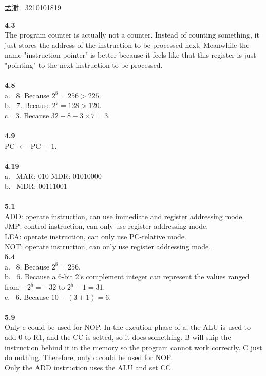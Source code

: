 \documentclass[a4paper,12pt]{article}     %
\begin{document}
\begin{center}   %
孟澍 \ 3210101819
\end{center}

\noindent %
\textbf{4.3}\\
The program counter is actually not a counter. Instead of counting something, it just stores the address of the instruction to be processed next. Meanwhile the name "instruction pointer" is better because it feels like that this register is just "pointing" to the next instruction to be processed.\\

~\\
\textbf{4.8}\\
a. \ 8. Because $2^8 = 256 > 225.$\\
b. \ 7. Because $2^7 = 128 > 120.$\\
c. \ 3. Because $32 - 8 - 3 \times 7 = 3.$\\

~\\
\textbf{4.9}\\
PC $\leftarrow$ PC + 1.\\

~\\
\textbf{4.19}\\
a. \ MAR: 010 \quad MDR: 01010000\\
b. \ MDR: 00111001 \\

~\\
\textbf{5.1}\\
ADD: operate instruction, can use immediate and register addressing mode.\\
JMP: control instruction, can only use register addressing mode.\\
LEA: operate instruction, can only use PC-relative mode.\\
NOT: operate instruction, can only use register addressing mode.\\

\newpage
\noindent
\textbf{5.4}\\
a. \ 8. Because $2^8 = 256.$\\
b. \ 6. Because a 6-bit 2's complement integer can represent the values ranged from $-2^{5} = -32$ to $2^{5}-1 = 31.$\\
c. \ 6. Because $10 - (3+1) = 6.$\\

~\\
\textbf{5.9}\\
Only c could be used for NOP. In the excution phase of a, the ALU is used to add 0 to R1, and the CC is setted, so it does something. B will skip the instruction behind it in the memory so the program cannot work correctly. C just do nothing. Therefore, only c could be used for NOP.\\
Only the ADD instruction uses the ALU and set CC.\\
\end{document}
